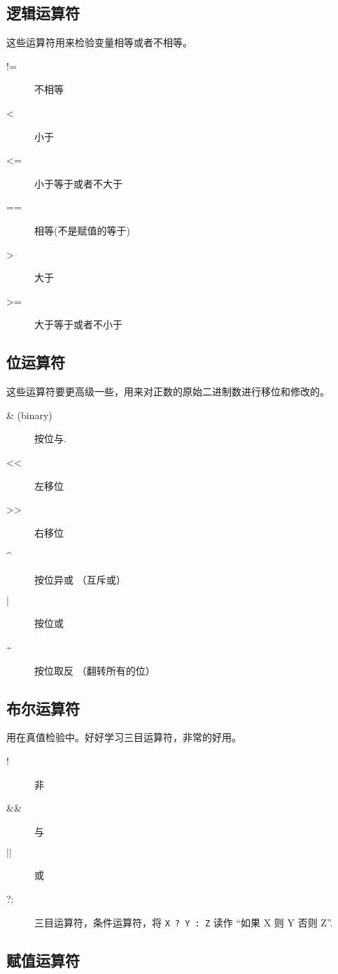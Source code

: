 \subsection{逻辑运算符}

这些运算符用来检验变量相等或者不相等。

\begin{description}
\item[!=] 不相等
\item[\textless{}] 小于
\item[\textless{}=] 小于等于或者不大于
\item[==] 相等(不是赋值的等于)
\item[\textgreater{}] 大于
\item[\textgreater{}=] 大于等于或者不小于
\end{description}

\subsection{位运算符}

这些运算符要更高级一些，用来对正数的原始二进制数进行移位和修改的。

\begin{description}
\item[\& (binary)] 按位与.
\item[\textless{}\textless{}] 左移位
\item[\textgreater{}\textgreater{}] 右移位
\item[\^{}] 按位异或 （互斥或）
\item[$\vert$] 按位或
\item[\textasciitilde{}] 按位取反 （翻转所有的位）
\end{description}


\subsection{布尔运算符}

用在真值检验中。好好学习三目运算符，非常的好用。

\begin{description}
\item[!] 非
\item[\&\&] 与
\item[$\vert\vert$] 或
\item[?:] 三目运算符，条件运算符，将 \verb|X ? Y : Z| 读作 “如果 X 则 Y 否则 Z”.
\end{description}

\subsection{赋值运算符}

